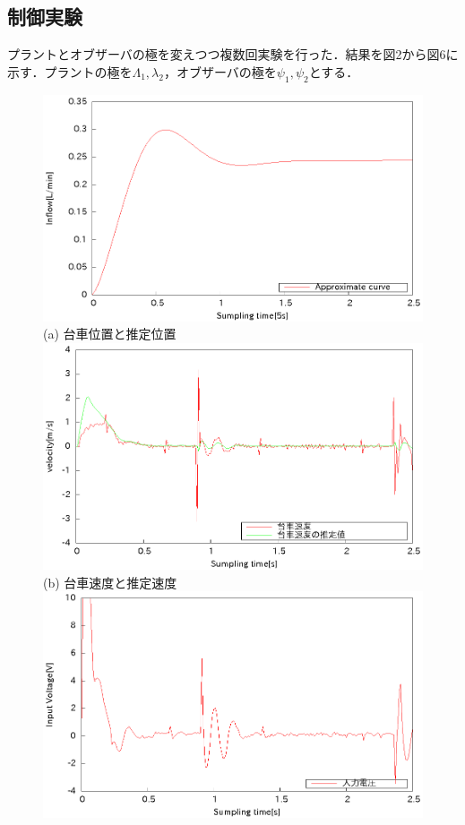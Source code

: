 \documentclass[11pt,a4paper]{jsarticle}
\begin{document}
 \subsection{制御実験}
 プラントとオブザーバの極を変えつつ複数回実験を行った．結果を図2から図6に示す．プラントの極を$\Lambda_1 ,\lambda_2$，オブザーバの極を$\psi_1,\psi_2$とする．
 \newpage
 \begin{figure}[H]
  \begin{center}
   \includegraphics[scale = .8]{./picture/exp3.eps} \\
   (a) 台車位置と推定位置 \\
   \includegraphics[scale = .8]{./picture/exp3_2.eps} \\
   (b) 台車速度と推定速度 \\
   \includegraphics[scale = .8]{./picture/exp3_3.eps} \\

\end{center}
\end{figure}
\end{document}
